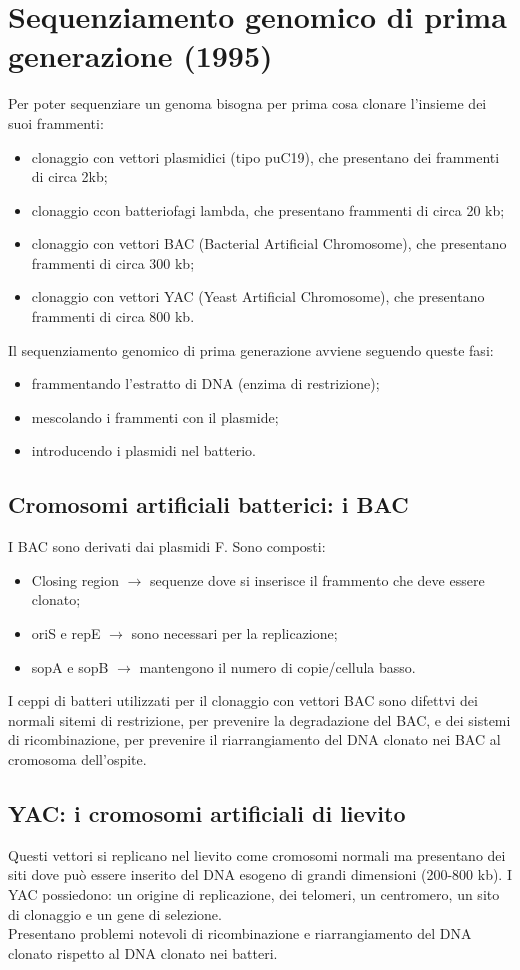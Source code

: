 \section{Sequenziamento genomico di prima generazione (1995)}
Per poter sequenziare un genoma bisogna per prima cosa clonare l'insieme dei suoi frammenti:
\begin{itemize}
    \item clonaggio con vettori plasmidici (tipo puC19), che presentano dei frammenti di circa 2kb;
    \item clonaggio ccon batteriofagi lambda, che presentano frammenti di circa 20 kb; 
    \item clonaggio con vettori BAC (Bacterial Artificial Chromosome), che presentano frammenti di circa 300 kb; 
    \item clonaggio con vettori YAC (Yeast Artificial Chromosome), che presentano frammenti di circa 800 kb.
\end{itemize}
Il sequenziamento genomico di prima generazione avviene seguendo queste fasi: 
\begin{itemize}
    \item frammentando l'estratto di DNA (enzima di restrizione); 
    \item mescolando i frammenti con il plasmide; 
    \item introducendo i plasmidi nel batterio.
\end{itemize}
\subsection{Cromosomi artificiali batterici: i BAC}
I BAC sono derivati dai plasmidi F. Sono composti: 
\begin{itemize}
    \item Closing region $\xrightarrow{}$ sequenze dove si inserisce il frammento che deve essere clonato; 
    \item oriS e repE $\xrightarrow{}$ sono necessari per la replicazione;
    \item sopA e sopB $\xrightarrow{}$ mantengono il numero di copie/cellula basso.
\end{itemize}
I ceppi di batteri utilizzati per il clonaggio con vettori BAC sono difettvi dei normali sitemi di restrizione, per prevenire la degradazione del BAC, e dei sistemi di ricombinazione, per prevenire il riarrangiamento del DNA clonato nei BAC al cromosoma dell'ospite.
\subsection{YAC: i cromosomi artificiali di lievito}
Questi vettori si replicano nel lievito come cromosomi normali ma presentano dei siti dove pu\`o essere inserito del DNA esogeno di grandi dimensioni (200-800 kb).
I YAC possiedono: un origine di replicazione, dei telomeri, un centromero, un sito di clonaggio e un gene di selezione.
\\Presentano problemi notevoli di ricombinazione e riarrangiamento del DNA clonato rispetto al DNA clonato nei batteri.

